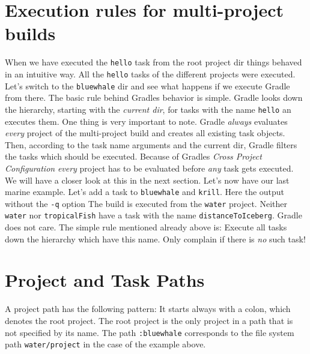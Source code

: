 \section{Execution rules for multi-project builds} %
\label{sec:execution_rules_for_multi_project_builds}
When we have executed the \texttt{hello} task from the root project dir things behaved in an intuitive way. All the \texttt{hello} tasks of the different projects were executed. Let's switch to the \texttt{bluewhale} dir and see what happens if we execute Gradle from there. 
The basic rule behind Gradles behavior is simple. Gradle looks down the hierarchy, starting with the \emph{current dir}, for tasks with the name \texttt{hello} an executes them. One thing is very important to note. Gradle \emph{always} evaluates \emph{every} project of the multi-project build and creates all existing task objects. Then, according to the task name arguments and the current dir, Gradle filters the tasks which should be executed. Because of Gradles \emph{Cross Project Configuration} \emph{every} project has to be evaluated before \emph{any} task gets executed. We will have a closer look at this in the next section. Let's now have our last marine example. Let's add a task to \texttt{bluewhale} and \texttt{krill}.
Here the output without the \texttt{-q} option
The build is executed from the \texttt{water} project. Neither \texttt{water} nor \texttt{tropicalFish} have a task with the name \texttt{distanceToIceberg}. Gradle does not care. The simple rule mentioned already above is: Execute all tasks down the hierarchy which have this name. Only complain if there is \emph{no} such task!

\section{Project and Task Paths} %
\label{sec:project_and_task_paths}
A project path has the following pattern: It starts always with a colon, which denotes the root project. The root project is the only project in a path that is not specified by its name. The path \texttt{:bluewhale} corresponds to the file system path \texttt{water/project} in the case of the example above.

